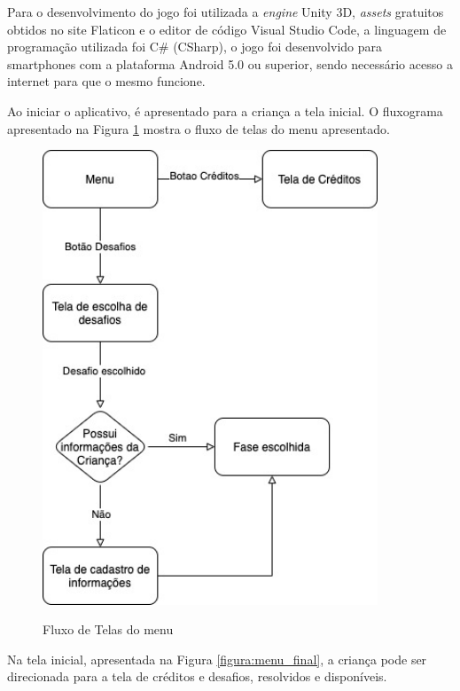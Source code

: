     Para o desenvolvimento do jogo foi utilizada a \textit{engine} Unity 3D, \textit{assets} gratuitos obtidos no site Flaticon \cite{flaticon} e o editor de código Visual Studio Code, a linguagem de programação utilizada foi C\# (CSharp), o jogo foi desenvolvido para smartphones com a plataforma Android 5.0 ou superior, sendo necessário acesso a internet para que o mesmo funcione.
    
    Ao iniciar o aplicativo, é apresentado para a criança a tela inicial. O fluxograma apresentado na Figura \ref{figura:fluxo_telas} mostra o fluxo de telas do menu apresentado.
    
    \begin{figure}[H]
        \caption{Fluxo de Telas do menu}
        \centering
        \includegraphics[width=10cm]{Imagens/Cap4/fluxo_menu.jpg}
        \label{figura:fluxo_telas}
    \end{figure}
    
    Na tela inicial, apresentada na Figura \ref{figura:menu_final}, a criança pode ser direcionada para a tela de créditos e desafios, resolvidos e disponíveis. 
    
